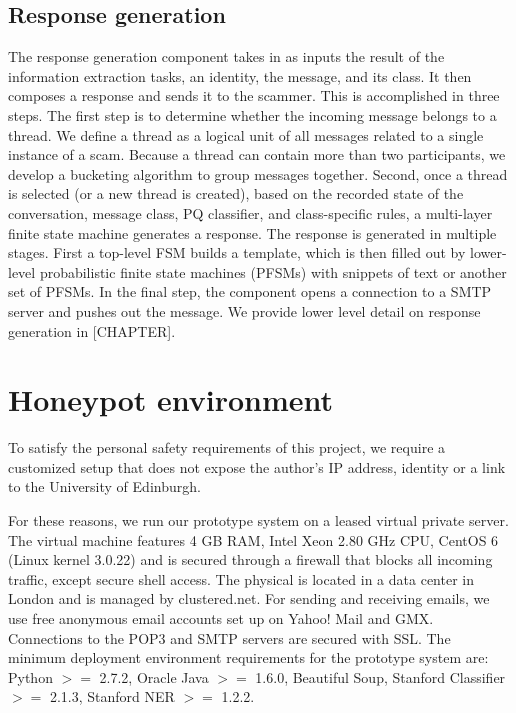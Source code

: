 \subsection*{Response generation}
The response generation component takes in as inputs the result of the information extraction tasks, an identity, the message, and its class. It then composes a response and sends it to the scammer. This is accomplished in three steps. The first step is to determine whether the incoming message belongs to a thread. We define a thread as a logical unit of all messages related to a single instance of a scam. Because a thread can contain more than two participants, we develop a bucketing algorithm to group messages together. Second, once a thread is selected (or a new thread is created), based on the recorded state of the conversation, message class, PQ classifier, and class-specific rules, a multi-layer finite state machine generates a response. The response is generated in multiple stages. First a top-level FSM builds a template, which is then filled out by lower-level probabilistic finite state machines (PFSMs) with snippets of text or another set of PFSMs. In the final step, the component opens a connection to a SMTP server and pushes out the message. We provide lower level detail on response generation in [CHAPTER].

\section{Honeypot environment}

To satisfy the personal safety requirements of this project, we require a customized setup that does not expose the author's IP address, identity or a link to the University of Edinburgh.

For these reasons, we run our prototype system on a leased virtual private server. The virtual machine features 4 GB RAM, Intel Xeon 2.80 GHz CPU, CentOS 6 (Linux kernel 3.0.22) and is secured through a firewall that blocks all incoming traffic, except secure shell access. The physical  is located in a data center in London and is managed by clustered.net. For sending and receiving emails, we use free anonymous email accounts set up on Yahoo! Mail and GMX. Connections to the POP3 and SMTP servers are secured with SSL. The minimum deployment environment requirements for the prototype system are: Python $>=$ 2.7.2, Oracle Java $>=$ 1.6.0, Beautiful Soup, Stanford Classifier $>=$ 2.1.3, Stanford NER $>=$ 1.2.2. 

